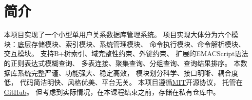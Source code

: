 \section{简介}
    本项目实现了一个小型单用户关系数据库管理系统。%
    项目实现大体分为六个模块：底层存储模块、索引模块、系统管理模块、%
    命令执行模块、命令解析模块、交互模块。%
    支持B+树索引、域完整性约束、外键约束、%
    扩展的EMACScript语法的正则表达式模糊查询、%
    多表连接、聚集查询、分组查询、查询结果排序。%
    本数据库系统完整严谨、功能强大、稳定高效，%
    模块划分科学、接口明晰、耦合度低，%
    代码简洁明快、风格优美、平台无关。
    本项目遵循\href{http://opensource.org/licenses/MIT}{MIT}开源协议，%
    托管在\href{https://github.com/JamisHoo/Database}{GitHub}。%
    但考虑到实际情况，在本课程结束之前，存储在私有仓库中。

